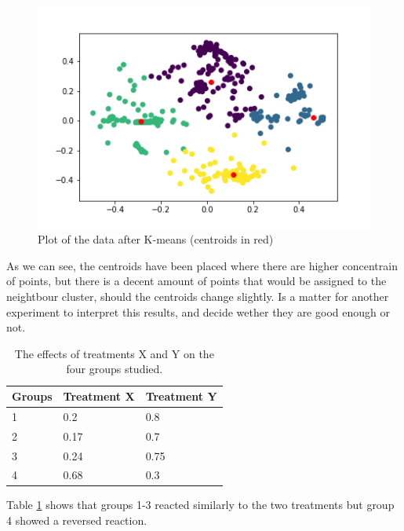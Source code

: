 \documentclass[idxtotoc,hyperref,openany]{labbook} %
\begin{document}
\begin{figure}[h]
\includegraphics[width=0.9\linewidth]{2710/KMeans_Plot_Gyroscope.png}
\setlength\belowcaptionskip{-10pt}
\caption{Plot of the data after K-means (centroids in red)}
\label{K-Means Gyroscope}
\end{figure}

As we can see, the centroids have been placed where there are higher concentrain of points, but there is a decent amount of points that would be assigned to the neightbour cluster, should the centroids change slightly. Is a matter for another experiment to interpret this results, and decide wether they are good enough or not.




\begin{table}[H]
\begin{tabular}{l l l}
\toprule
\textbf{Groups} & \textbf{Treatment X} & \textbf{Treatment Y} \\
\toprule
1 & 0.2 & 0.8\\
2 & 0.17 & 0.7\\
3 & 0.24 & 0.75\\
4 & 0.68 & 0.3\\
\bottomrule
\end{tabular}
\caption{The effects of treatments X and Y on the four groups studied.}
\label{tab:treatments_xy}
\end{table}

Table \ref{tab:treatments_xy} shows that groups 1-3 reacted similarly to the two treatments but group 4 showed a reversed reaction.
\end{document}
